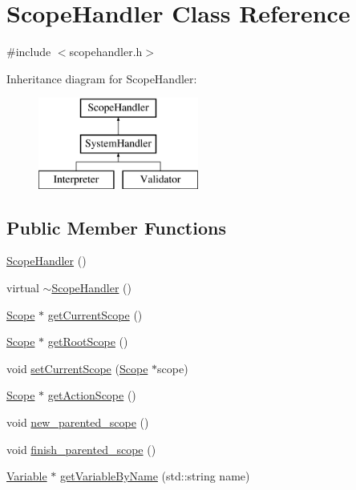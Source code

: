 \hypertarget{classScopeHandler}{}\section{Scope\+Handler Class Reference}
\label{classScopeHandler}


{\ttfamily \#include $<$scopehandler.\+h$>$}

Inheritance diagram for Scope\+Handler\+:\begin{figure}[H]
\begin{center}
\leavevmode
\includegraphics[height=3.000000cm]{classScopeHandler}
\end{center}
\end{figure}
\subsection*{Public Member Functions}
\begin{DoxyCompactItemize}
\item 
\hyperlink{classScopeHandler_a27b5c6a49bda76740ed06114eb250ed1}{Scope\+Handler} ()
\item 
virtual \hyperlink{classScopeHandler_acb1cddd8d15f29d2ce656dff6192c53f}{$\sim$\+Scope\+Handler} ()
\item 
\hyperlink{classScope}{Scope} $\ast$ \hyperlink{classScopeHandler_af6dae9d47ebc9ed6c6931243d2ccee8f}{get\+Current\+Scope} ()
\item 
\hyperlink{classScope}{Scope} $\ast$ \hyperlink{classScopeHandler_af01a4b16265a02b1c786ad54815dd96d}{get\+Root\+Scope} ()
\item 
void \hyperlink{classScopeHandler_a7627747afbebc1dd7017da404fcabd3c}{set\+Current\+Scope} (\hyperlink{classScope}{Scope} $\ast$scope)
\item 
\hyperlink{classScope}{Scope} $\ast$ \hyperlink{classScopeHandler_aabc3a430b566706a8c868a5b1118e37b}{get\+Action\+Scope} ()
\item 
void \hyperlink{classScopeHandler_a9d3db5f048c118eba258981cf04ffd05}{new\+\_\+parented\+\_\+scope} ()
\item 
void \hyperlink{classScopeHandler_a288db413dfebc5a5e18d0cf4ae1b5dfb}{finish\+\_\+parented\+\_\+scope} ()
\item 
\hyperlink{classVariable}{Variable} $\ast$ \hyperlink{classScopeHandler_afd5d7cc4438b75b3ac78e52f1d1779f8}{get\+Variable\+By\+Name} (std\+::string name)
\end{DoxyCompactItemize}


